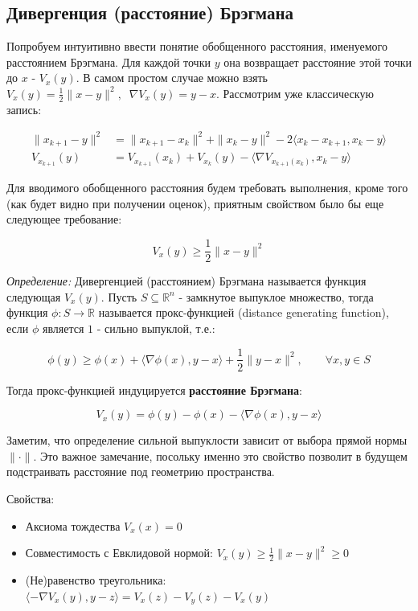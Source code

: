 \documentclass[a4paper,12pt]{article}
\theoremstyle{plain} %
\theoremstyle{definition} %
\theoremstyle{remark} %
\theoremstyle{definition}
\theoremstyle{definition}
\let\geq\geqslant
\begin{document}
\subsection{Дивергенция (расстояние) Брэгмана}

Попробуем интуитивно ввести понятие обобщенного расстояния, именуемого расстоянием Брэгмана. Для каждой точки $y$ она возвращает расстояние этой точки до $x$ - $V_x(y)$. В самом простом случае можно взять $V_x(y) = \frac{1}{2}\|x-y\|^2, \;\; \nabla V_x(y) = y-x$. Рассмотрим уже классическую запись:

\begin{align*}
\|x_{k+1} - y\|^2  &= \|x_{k+1}-x_k \|^2 + \|x_k - y\|^2 - 2 \langle x_k - x_{k+1} ,x_k - y\rangle \\
V_{x_{k+1}}(y) &= V_{x_{k+1}}(x_k) + V_{x_{k}}(y) - \langle \nabla V_{x_{k+1}(x_k)}, x_k - y \rangle
\end{align*}

Для вводимого обобщенного расстояния будем требовать выполнения, кроме того (как будет видно при получении оценок), приятным свойством было бы еще следующее требование:

$$
V_x(y) \geq \frac{1}{2} \|x-y\|^2
$$

\textit{Определение:} Дивергенцией (расстоянием) Брэгмана называется функция следующая $V_x(y)$. Пусть $S \subseteq \mathbb{R}^n$ - замкнутое выпуклое множество, тогда функция $\phi : S \to \mathbb{R}$ называется прокс-функцией (distance generating function), если $\phi$ является $1$ - сильно выпуклой, т.е.:

$$
\phi(y) \geq \phi(x) + \langle \nabla \phi(x), y-x\rangle + \frac{1}{2} \|y-x\|^2, \qquad \forall x,y \in S
$$

Тогда прокс-функцией индуцируется \textbf{расстояние Брэгмана}:

$$
V_x(y) = \phi(y) - \phi(x) - \langle\nabla \phi(x), y-x\rangle
$$

Заметим, что определение сильной выпуклости зависит от выбора прямой нормы $\|\cdot\|$. Это важное замечание, посольку именно это свойство позволит в будущем подстраивать расстояние под геометрию пространства.

Свойства:
\begin{itemize}
\item Аксиома тождества $V_x(x) = 0$
\item Совместимость с Евклидовой нормой: $V_x(y) \geq \frac{1}{2}\|x-y\|^2 \geq 0$
\item (Не)равенство треугольника: $\langle -\nabla V_x(y), y-z\rangle = V_x(z) - V_y(z) - V_x(y)$
\end{itemize}
\end{document}
